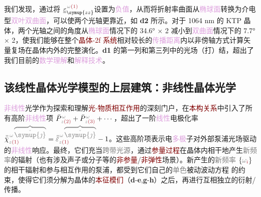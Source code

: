 我们发现，通过将 $\underline{\varepsilon}^{\;\! \mathcolor{gray}{\omega} \textcolor{Maroon}{(1)}}_{\symup{zz}}$设置为\textcolor{Plum}{负值}，从而将\textcolor{PineGreen}{折射率曲面}从\textcolor{Plum}{椭球面}转换为\textcolor{NavyBlue}{介电型}\textcolor{Plum}{双叶双曲面}，可以使两个\textcolor{PineGreen}{光轴}更靠近，如 \textbf{d2} 所示。对于 1064 nm 的 KTP 晶体，两个\textcolor{PineGreen}{光轴}之间的角度从\textcolor{Plum}{椭球面}情况下的 34.6° × 2 减小到\textcolor{Plum}{双曲面}情况下的 7.7° × 2，使我们能够在整个\textcolor{Maroon}{晶体-2f 系统}相对较长的\textcolor{Plum}{传播距离}内以\textcolor{PineGreen}{非傍轴}方式计算\textcolor{PineGreen}{矢量复场}在晶体内外的完整演化。\textbf{d1} 的第一列和第三列中的光场（打）结，超出了我们目前的\textcolor{Plum}{数学理解}和\textcolor{Plum}{解释技术}。

\subsection{该线性晶体光学模型的上层建筑：非线性晶体光学}\label{ssec:LFCO-Superstructure}

\textcolor{Plum}{非线性}光学作为探索和理解\textcolor{Maroon}{光-物质相互作用}的深刻门户，在\textcolor{Maroon}{本构关系}中引入了所有高阶\textcolor{Plum}{非线性}项 $\bar{P}^{\;\! \mathcolor{gray}{\omega}}_{\;\! \mathcolor{gray}{z} \textcolor{Maroon}{(2)}} + \bar{P}^{\;\! \mathcolor{gray}{\omega}}_{\;\! \mathcolor{gray}{z} \textcolor{Maroon}{(3)}} + \cdots$，超出了一阶\textcolor{Plum}{线性}电极化率 $\bar{\bar{\chi}}^{\;\! \mathcolor{gray}{\omega} \mathcolor{gray}{\overbrace{\check{\symup{\jmath}}}}}_{\mathcolor{gray}{z} \textcolor{Maroon}{(1)}} = \bar{\bar{\varepsilon}}^{\;\! \mathcolor{gray}{\omega} \mathcolor{gray}{\overbrace{\check{\symup{\jmath}}}}}_{\mathcolor{gray}{z} \textcolor{Maroon}{(1)}} - 1$。这些高阶项表示电\textcolor{Plum}{多极}子对外部\textcolor{NavyBlue}{泵浦光场}驱动的\textcolor{Plum}{非线性}响应。最终，它们充当\textcolor{gray}{跨带}\textcolor{gray}{光源}，通过\textcolor{Maroon}{参量过程}在晶体内\textcolor{PineGreen}{相干}地产生\textcolor{gray}{新频率}的辐射（也有涉及声子或分子等的\textcolor{Maroon}{非参量}/\textcolor{Maroon}{非弹性}场景\cite{grundmannOpticallyAnisotropicMedia2017,boydNonlinearOptics2019}）。新产生的\textcolor{gray}{新频率} $\{ \mathcolor{gray}{\omega}_{\textcolor{Maroon}{i}} \}$ 的相干辐射和参与相互作用的\textcolor{NavyBlue}{泵浦}，都受到它们自己的\textcolor{gray}{单色}\textcolor{NavyBlue}{被动}波动方程  的约束，使得它们须分解为晶体的\textcolor{Maroon}{本征模们}（\textbf{d}-\textbf{e},\textbf{g}-\textbf{h}）之后，再进行互相独立的衍射/传播。

